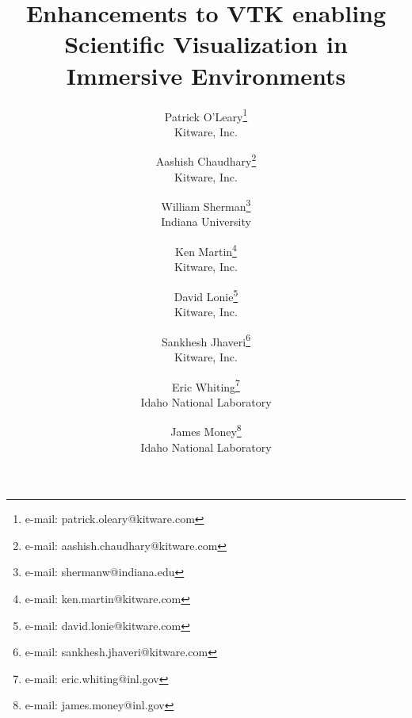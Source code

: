 \title{Enhancements to VTK enabling\\ Scientific Visualization in Immersive Environments}

\author{Patrick O'Leary\thanks{e-mail: patrick.oleary@kitware.com}\\ %
        \scriptsize Kitware, Inc. %
\and Aashish Chaudhary\thanks{e-mail: aashish.chaudhary@kitware.com}\\ %
        \scriptsize Kitware, Inc. %
\and William Sherman\thanks{e-mail: shermanw@indiana.edu}\\ %
        \scriptsize Indiana University %
\and Ken Martin\thanks{e-mail: ken.martin@kitware.com}\\ %
        \scriptsize Kitware, Inc. %
\and David Lonie\thanks{e-mail: david.lonie@kitware.com}\\ %
        \scriptsize Kitware, Inc. %
\and Sankhesh Jhaveri\thanks{e-mail: sankhesh.jhaveri@kitware.com}\\ %
        \scriptsize Kitware, Inc. %
\and Eric Whiting\thanks{e-mail: eric.whiting@inl.gov}\\ %
        \scriptsize Idaho National Laboratory %
\and James Money\thanks{e-mail: james.money@inl.gov}\\ %
        \scriptsize Idaho National Laboratory %
        }
